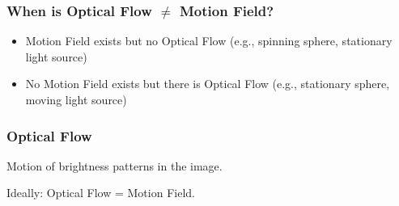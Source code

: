 \begin{frame}
  \frametitle{When is Optical Flow $\neq$ Motion Field?}


  \begin{figure}[!h]
    \hspace*{2em}
  \end{figure}

\begin{itemize}
  \item Motion Field exists but no Optical Flow (e.g., spinning sphere, stationary light source)
  \item No Motion Field exists but there is Optical Flow (e.g., stationary sphere, moving light source)
\end{itemize}

\end{frame}

\begin{frame}
  \frametitle{Optical Flow}
Motion of brightness patterns in the image.

Ideally: Optical Flow = Motion Field.

\vspace{0.5cm}
\centering
\end{frame}

